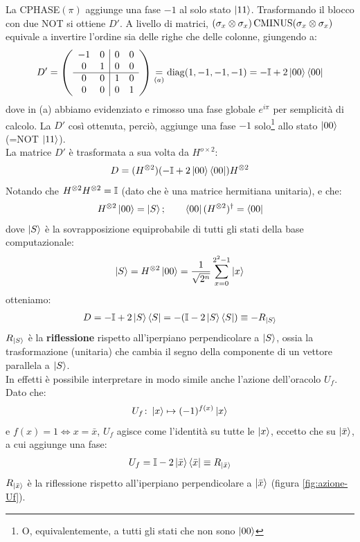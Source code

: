\documentclass[../../InformazioneQuantistica.tex]{subfiles}
\begin{document}
La CPHASE$(\pi)$ aggiunge una fase $-1$ al solo stato $\Ket{11}$. Trasformando il blocco con due NOT si ottiene $D'$. A livello di matrici, $(\sigma_x \otimes \sigma_x) \operatorname{CMINUS} (\sigma_x \otimes \sigma_x)$ equivale a invertire l'ordine sia delle righe che delle colonne, giungendo a:
\begin{align*}
D' = \left( \begin{array}{cc|cc}
-1 & 0 & 0 & 0\\
0 & 1 & 0 & 0\\ \hline
0 & 0 & 1 & 0\\
0 & 0 & 0 & 1
\end{array}\right) \underset{(a)}{=} \operatorname{diag}(1,-1,-1,-1)= -\mathbb{I} + 2\Ket{00}\Bra{00}
\end{align*}
dove in (a) abbiamo evidenziato e rimosso una fase globale $e^{i\pi}$ per semplicità di calcolo. La $D'$ così ottenuta, perciò, aggiunge una fase $-1$ solo\footnote{O, equivalentemente, a tutti gli stati che non sono $\Ket{00}$} allo stato $\Ket{00}$ (=NOT $\Ket{11}$).\\

La matrice $D'$ è trasformata a sua volta da $H^{o\times 2}$:
\begin{align*}
    D = (H^{\otimes 2}) (-\mathbb{I} + 2\Ket{00}\Bra{00}) H^{\otimes 2}
\end{align*}
Notando che $H^{\otimes 2} H^{\otimes 2} = \mathbb{I}$ (dato che è una matrice hermitiana unitaria), e che:
\begin{align*}
    H^{\otimes 2} \Ket{00} = \Ket{S}; \qquad \Bra{00}(H^{\otimes 2})^\dag = \Bra{00}
\end{align*}
dove $\Ket{S}$ è la sovrapposizione equiprobabile di tutti gli stati della base computazionale:
\begin{align*}
    \Ket{S} = H^{\otimes 2} \Ket{00} = \frac{1}{\sqrt{2^n}}\sum_{x=0}^{2^2-1} \Ket{x}
\end{align*}
otteniamo:
\begin{align*}
    D = -\mathbb{I} + 2\Ket{S}\Bra{S} = -(\mathbb{I} - 2\Ket{S}\Bra{S}) \equiv - R_{\Ket{S}}
\end{align*}
$R_{\Ket{S}}$ è la \textbf{riflessione} rispetto all'iperpiano perpendicolare a $\Ket{S}$, ossia la trasformazione (unitaria) che cambia il segno della componente di un vettore parallela a $\Ket{S}$.\\

In effetti è possibile interpretare in modo simile anche l'azione dell'oracolo $U_f$. Dato che:
\begin{align*}
    U_f \colon \Ket{x} \mapsto (-1)^{f(x)}\Ket{x}
\end{align*}
e $f(x)=1 \Leftrightarrow x=\bar{x}$, $U_f$ agisce come l'identità su tutte le $\Ket{x}$, eccetto che su $\Ket{\bar{x}}$, a cui aggiunge una fase:
\begin{align*}
    U_f = \mathbb{I} - 2\Ket{\bar{x}}\Bra{\bar{x}} \equiv R_{\Ket{\bar{x}}}
\end{align*}
$R_{\Ket{\bar{x}}}$ è la riflessione rispetto all'iperpiano perpendicolare a $\Ket{\bar{x}}$ (figura \ref{fig:azione-Uf}).
\end{document}
